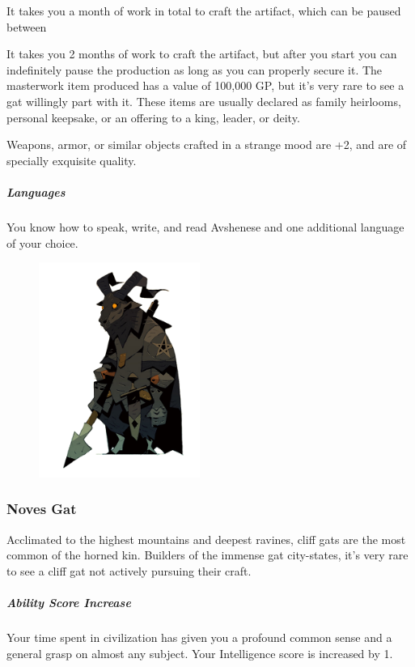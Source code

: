     It takes you a month of work in total to craft the artifact, which can be paused between

    It takes you 2 months of work to craft the artifact, but after you start you can indefinitely pause the production as long as you can properly secure it.
    The masterwork item produced has a value of 100,000 GP, but it's very rare to see a gat willingly part with it.
    These items are usually declared as family heirlooms, personal keepsake, or an offering to a king, leader, or deity.

    Weapons, armor, or similar objects crafted in a strange mood are +2, and are of specially exquisite quality.

    \subparagraph{Languages} You know how to speak, write, and read Avshenese and one additional language of your choice.

\begin{figure}[!b]
    \centering
    \includegraphics[width=0.47\textwidth]{04kins/img/11gat_knight.png}
\end{figure}

\newpage

\subsubsection{Noves Gat}
    Acclimated to the highest mountains and deepest ravines, cliff gats are the most common of the horned kin.
    Builders of the immense gat city-states, it's very rare to see a cliff gat not actively pursuing their craft.

    \subparagraph{Ability Score Increase} Your time spent in civilization has given you a profound common sense and a general grasp on almost any subject.
    Your Intelligence score is increased by 1.

